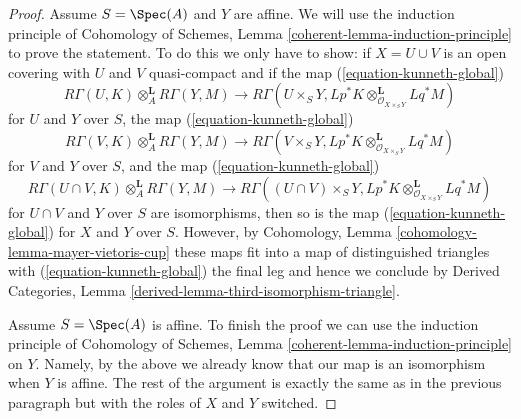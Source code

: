 \begin{proof}
\medskip\noindent
Assume $S = \Spec(A)$ and $Y$ are affine. We will use the induction
principle of
Cohomology of Schemes, Lemma \ref{coherent-lemma-induction-principle}
to prove the statement. To do this we only have to show:
if $X = U \cup V$ is an open covering with $U$ and $V$ quasi-compact
and if the map (\ref{equation-kunneth-global})
$$
R\Gamma(U, K) \otimes_A^\mathbf{L} R\Gamma(Y, M)
\longrightarrow
R\Gamma(U \times_S Y,
Lp^*K \otimes_{\mathcal{O}_{X \times_S Y}}^\mathbf{L} Lq^*M)
$$
for $U$ and $Y$ over $S$, the map (\ref{equation-kunneth-global})
$$
R\Gamma(V, K) \otimes_A^\mathbf{L} R\Gamma(Y, M)
\longrightarrow
R\Gamma(V \times_S Y,
Lp^*K \otimes_{\mathcal{O}_{X \times_S Y}}^\mathbf{L} Lq^*M)
$$
for $V$ and $Y$ over $S$, and the map (\ref{equation-kunneth-global})
$$
R\Gamma(U \cap V, K) \otimes_A^\mathbf{L} R\Gamma(Y, M)
\longrightarrow
R\Gamma((U \cap V) \times_S Y,
Lp^*K \otimes_{\mathcal{O}_{X \times_S Y}}^\mathbf{L} Lq^*M)
$$
for $U \cap V$ and $Y$ over $S$ are isomorphisms, then so is the map
(\ref{equation-kunneth-global}) for $X$ and $Y$ over $S$.
However, by Cohomology, Lemma \ref{cohomology-lemma-mayer-vietoris-cup}
these maps fit into a map of distinguished triangles with
(\ref{equation-kunneth-global}) the final leg and hence we conclude
by Derived Categories, Lemma \ref{derived-lemma-third-isomorphism-triangle}.

\medskip\noindent
Assume $S = \Spec(A)$ is affine. To finish the proof we can use the
induction principle of
Cohomology of Schemes, Lemma \ref{coherent-lemma-induction-principle}
on $Y$. Namely, by the above we already know that our map is
an isomorphism when $Y$ is affine. The rest of the argument is
exactly the same as in the previous paragraph but with the roles of
$X$ and $Y$ switched.
\end{proof}

